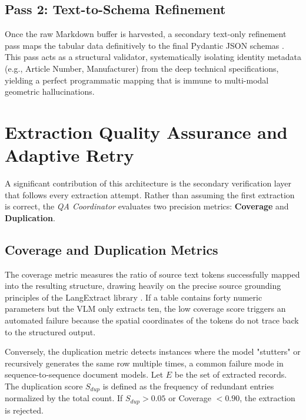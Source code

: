 \subsection{Pass 2: Text-to-Schema Refinement}
Once the raw Markdown buffer is harvested, a secondary text-only refinement pass maps the tabular data definitively to the final Pydantic JSON schemas \citep{pydantic}. This pass acts as a structural validator, systematically isolating identity metadata (e.g., Article Number, Manufacturer) from the deep technical specifications, yielding a perfect programmatic mapping that is immune to multi-modal geometric hallucinations.

\section{Extraction Quality Assurance and Adaptive Retry}
\label{sec:qa_layer}

A significant contribution of this architecture is the secondary verification layer that follows every extraction attempt. Rather than assuming the first extraction is correct, the \textit{QA Coordinator} evaluates two precision metrics: \textbf{Coverage} and \textbf{Duplication}.

\subsection{Coverage and Duplication Metrics}
The coverage metric measures the ratio of source text tokens successfully mapped into the resulting structure, drawing heavily on the precise source grounding principles of the LangExtract library \citep{langextract}. If a table contains forty numeric parameters but the VLM only extracts ten, the low coverage score triggers an automated failure because the spatial coordinates of the tokens do not trace back to the structured output.

Conversely, the duplication metric detects instances where the model "stutters" or recursively generates the same row multiple times, a common failure mode in sequence-to-sequence document models. Let $E$ be the set of extracted records. The duplication score $S_{dup}$ is defined as the frequency of redundant entries normalized by the total count. If $S_{dup} > 0.05$ or Coverage $< 0.90$, the extraction is rejected.

